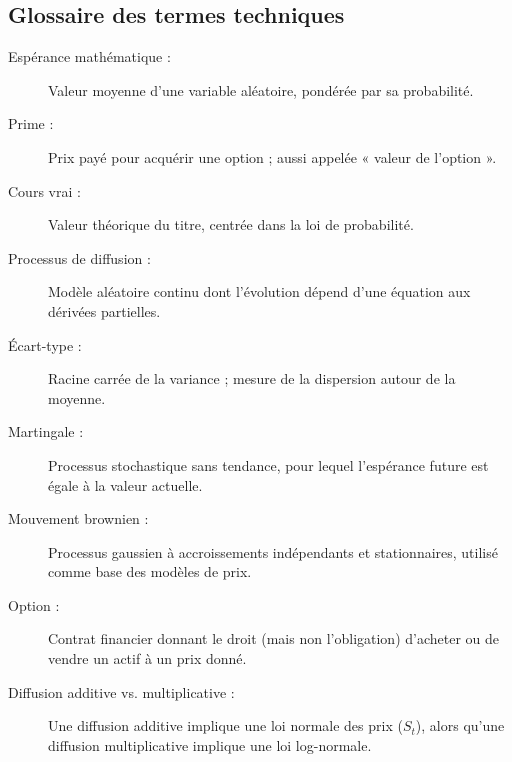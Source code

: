 \documentclass[12pt,a4paper]{article}
\begin{document}
\subsection{Glossaire des termes techniques}

\begin{description}
    \item[Espérance mathématique :] Valeur moyenne d’une variable aléatoire, pondérée par sa probabilité.
    \item[Prime :] Prix payé pour acquérir une option ; aussi appelée « valeur de l’option ».
    \item[Cours vrai :] Valeur théorique du titre, centrée dans la loi de probabilité.
    \item[Processus de diffusion :] Modèle aléatoire continu dont l’évolution dépend d’une équation aux dérivées partielles.
    \item[Écart-type :] Racine carrée de la variance ; mesure de la dispersion autour de la moyenne.
    \item[Martingale :] Processus stochastique sans tendance, pour lequel l’espérance future est égale à la valeur actuelle.
    \item[Mouvement brownien :] Processus gaussien à accroissements indépendants et stationnaires, utilisé comme base des modèles de prix.
    \item[Option :] Contrat financier donnant le droit (mais non l’obligation) d’acheter ou de vendre un actif à un prix donné.
    \item[Diffusion additive vs. multiplicative :] Une diffusion additive implique une loi normale des prix ($S_t$), alors qu’une diffusion multiplicative implique une loi log-normale.
\end{description}
\end{document}
